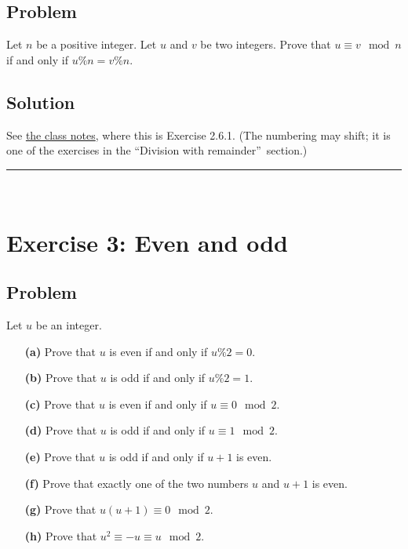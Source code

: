 \documentclass[paper=a4, fontsize=12pt]{scrartcl}%
\theoremstyle{plainsl}
\theoremstyle{definition}
\theoremstyle{remark}
\begin{document}
\subsection{Problem}

Let $n$ be a positive integer. Let $u$ and $v$ be two integers. Prove that
$u\equiv v\mod n$ if and only if $u\%n=v\%n$.

\subsection{Solution}

See \href{http://www.cip.ifi.lmu.de/~grinberg/t/19s/notes.pdf}{the class
notes}, where this is Exercise 2.6.1. (The numbering may shift; it is one of
the exercises in the \textquotedblleft Division with
remainder\textquotedblright\ section.)

\rule{\linewidth}{0.3pt} \\[0.4cm]

\section{Exercise 3: Even and odd}

\subsection{Problem}

Let $u$ be an integer.

\begin{enumerate}
\item[\textbf{(a)}] Prove that $u$ is even if and only if $u \% 2 = 0$.

\item[\textbf{(b)}] Prove that $u$ is odd if and only if $u \% 2 = 1$.

\item[\textbf{(c)}] Prove that $u$ is even if and only if $u \equiv0 \mod 2$.

\item[\textbf{(d)}] Prove that $u$ is odd if and only if $u \equiv1 \mod 2$.

\item[\textbf{(e)}] Prove that $u$ is odd if and only if $u + 1$ is even.

\item[\textbf{(f)}] Prove that exactly one of the two numbers $u$ and $u + 1$
is even.

\item[\textbf{(g)}] Prove that $u \left(  u+1 \right)  \equiv0 \mod 2$.

\item[\textbf{(h)}] Prove that $u^{2} \equiv-u \equiv u \mod 2$.
\end{enumerate}
\end{document}
